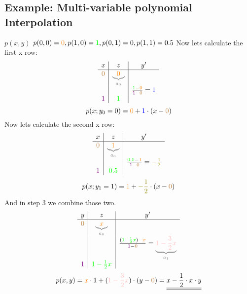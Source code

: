 \subsection{Example: Multi-variable polynomial Interpolation}
$p(x,y)$
$p(0,0)=\textcolor{orange}{0}, p(1,0)=\textcolor{green}{1}, p(0,1)=0, p(1,1)=0.5$
Now lets calculate the first x row:
\[
	\begin{array}{c|c|c}
 x & z & y'\\
\hline
	\textcolor{brown}{0} & \textcolor{gray}{\underbrace{\textcolor{orange}{0}}_{a_{0}}}\\
	    &     & \frac{\textcolor{green}{1}-\textcolor{orange}{0}}{\textcolor{violet}{1}-\textcolor{brown}{0}}=\textcolor{blue}{1} \\
	\textcolor{violet}{1} & \textcolor{green}{1}
	                     

	\end{array}
\]
$$
p(x;y_0=0)=\textcolor{orange}{0} + \textcolor{blue}{1} \cdot (x-\textcolor{brown}{0})
$$
Now lets calculate the second x row:
\[
	\begin{array}{c|c|c}
 x & z & y'\\
\hline
	\textcolor{brown}{0} & \textcolor{gray}{\underbrace{\textcolor{orange}{1}}_{a_{0}}}\\
	    &     & \frac{\textcolor{green}{0.5}-\textcolor{orange}{1}}{\textcolor{violet}{1}-\textcolor{brown}{0}}=\textcolor{olive}{-\frac{1}{2}} \\
	\textcolor{violet}{1} & \textcolor{green}{0.5}
	                     

	\end{array}
\]
$$
p(x;y_1=1)=\textcolor{orange}{1} + \textcolor{olive}{-\frac{1}{2}} \cdot (x-\textcolor{brown}{0})
$$
And in step 3 we combine those two.
\[
	\begin{array}{c|c|c}
 y & z & y'\\
\hline
	\textcolor{brown}{0} & \textcolor{gray}{\underbrace{\textcolor{orange}{x}}_{a_{0}}}\\
	    &     & \frac{(\textcolor{green}{1-\frac{1}{2}x})-\textcolor{orange}{x}}{\textcolor{violet}{1}-\textcolor{brown}{0}}=\textcolor{gray}{\underbrace{\textcolor{pink}{1-\frac{3}{2}x}}_{a_{1}}} \\
	\textcolor{violet}{1} & \textcolor{green}{1-\frac{1}{2}x}
	                     

	\end{array}
\]
$$
p(x,y)=\textcolor{orange}{x}\cdot 1 + (\textcolor{pink}{1-\frac{3}{2}x}) \cdot (y-\textcolor{brown}{0})=\underline{\underline{x-\frac{1}{2}\cdot x\cdot y}}
$$
